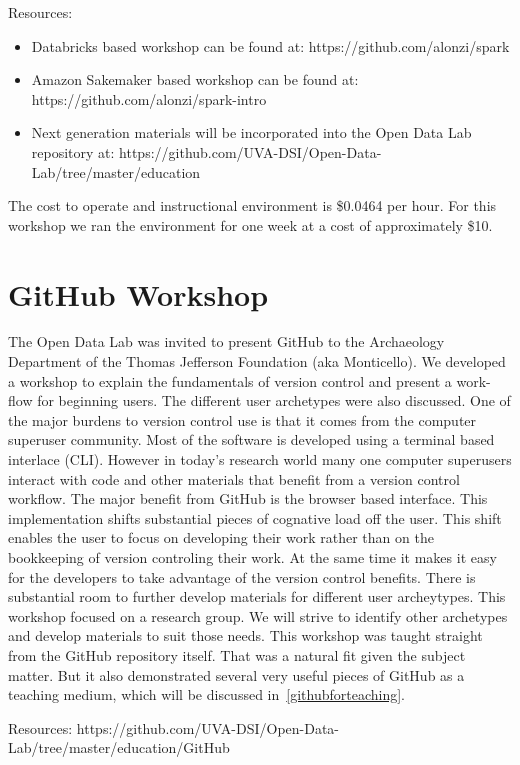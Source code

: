 Resources:
\begin{itemize}
\item Databricks based workshop can be found at: https://github.com/alonzi/spark
\item Amazon Sakemaker based workshop can be found at: https://github.com/alonzi/spark-intro
\item Next generation materials will be incorporated into the Open Data Lab repository at: https://github.com/UVA-DSI/Open-Data-Lab/tree/master/education
\end{itemize}

The cost to operate and instructional environment is \$0.0464 per hour. For this workshop we ran the environment for one week at a cost of approximately \$10.

\section{GitHub Workshop}
\label{sec:git}
The Open Data Lab was invited to present GitHub to the Archaeology Department of the Thomas Jefferson Foundation (aka Monticello). We developed a workshop to explain the fundamentals of version control and present a work-flow for beginning users. The different user archetypes were also discussed.
One of the major burdens to version control use is that it comes from the computer superuser community. Most of the software is developed using a terminal based interlace (CLI). However in today's research world many one computer superusers interact with code and other materials that benefit from a version control workflow.
The major benefit from GitHub is the browser based interface. This implementation shifts substantial pieces of cognative load off the user. This shift enables the user to focus on developing their work rather than on the bookkeeping of version controling their work. At the same time it makes it easy for the developers to take advantage of the version control benefits.
There is substantial room to further develop materials for different user archeytypes. This workshop focused on a research group. We will strive to identify other archetypes and develop materials to suit those needs.
This workshop was taught straight from the GitHub repository itself. That was a natural fit given the subject matter. But it also demonstrated several very useful pieces of GitHub as a teaching medium, which will be discussed in~\ref{githubforteaching}.

Resources: https://github.com/UVA-DSI/Open-Data-Lab/tree/master/education/GitHub

